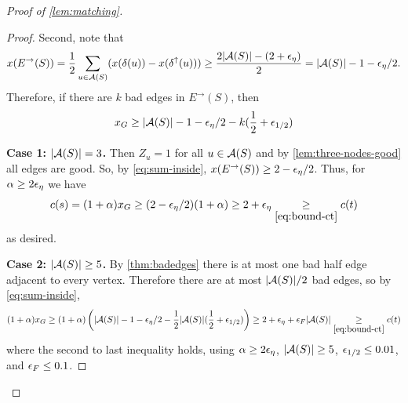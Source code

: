 \begin{proof}[Proof of \cref{lem:matching}]
\begin{proof}
Second, note that
\begin{align*}x(E^\rightarrow (S))  = \frac12 \sum_{u \in {\cal A}(S)} (x(\delta (u)) - x(\delta ^\uparrow (u))) 
\ge \frac{2 |{\cal A}(S)| - (2 + {\epsilon}_\eta)}{2}
= |{\cal A}(S)| - 1 - {\epsilon}_\eta/2.
\end{align*}
Therefore, if there are $k$ bad edges in $E^\rightarrow(S)$, then
\begin{align}
	x_G \ge |{\cal A}(S)| - 1 - {\epsilon}_\eta/2 - k(\frac{1}{2}+{\epsilon}_{1/2}) \label{eq:sum-inside}
\end{align}


\textbf{Case 1: $|{\cal A}(S)|=3$.} Then $Z_u=1$ for all $u\in{\cal A}(S)$ and by \cref{lem:three-nodes-good} all edges are good. 
So, by \cref{eq:sum-inside},
$x(E ^\rightarrow (S))\ge 2- {\epsilon}_\eta/2$. %
Thus, for $\alpha\geq 2{\epsilon}_\eta$ we have
$$c(s) = (1+ \alpha) x_G \ge (2-\epsilon_\eta/2)(1+\alpha) \ge 2+\epsilon_\eta \underset{\cref{eq:bound-ct}}{\ge} c(t)$$
as desired. 

\textbf{Case 2: $|{\cal A}(S)|\geq 5$.} By \cref{thm:badedges} there is at most one bad half edge adjacent to every vertex. Therefore there are at most  $|{\cal A}(S)|/2$ bad edges, so by \cref{eq:sum-inside}, 
$$(1+\alpha)x_G \ge (1+\alpha)\left(|\cA(S)| - 1 - \eps_\eta/2 - \frac{1}{2}|\cA(S)|(\frac{1}{2}+\eps_{1/2})\right) \ge 2+\epsilon_\eta + \eps_F |\cA(S)| \underset{\cref{eq:bound-ct}}{\ge} c(t)$$
where the second to last inequality holds, using $\alpha \ge  2 {\epsilon}_\eta$, $|{\cal A}(S)|\ge 5$, ${\epsilon}_{1/2} \le 0.01$, and ${\epsilon}_F \le 0.1$.


\end{proof}
\end{proof}
